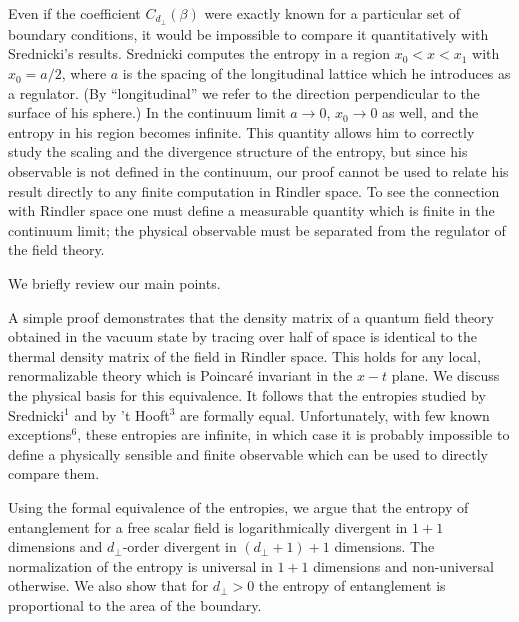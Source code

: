 Even if the coefficient $C_{d_\perp}(\beta)$ were exactly known
for a particular set of boundary conditions, it would be impossible
to compare it quantitatively with Srednicki's results.
Srednicki computes the entropy
in a region $x_0<x<x_1$ with $x_0=a/2$,
where $a$ is the spacing of the longitudinal lattice which he introduces as
a regulator.  (By ``longitudinal'' we refer to the direction perpendicular
to the surface of his sphere.)  In the continuum limit
$a\rightarrow 0$, $x_0\rightarrow 0$ as well,
and the entropy in his region
becomes infinite.  This quantity allows him to correctly study the scaling
 and the divergence
structure of the entropy, but since his observable is not defined in the
continuum, our proof cannot be used to
relate his result directly to any finite computation
in Rindler space.  To see the connection with Rindler space one must define
a measurable quantity which is finite in the continuum limit;
the physical observable must be
separated from the regulator of the field theory.



\bigskip
\goodbreak
{}
\nobreak
\medskip
\nobreak
We briefly review our main points.

A simple proof demonstrates that the density matrix
of a quantum field theory obtained in the vacuum state
by tracing over half of space is
identical to the thermal density matrix of the field in Rindler space.
This holds for any local, renormalizable theory which is Poincar\'e
invariant in the $x-t$ plane.
We discuss the physical basis for this
equivalence.  It follows that the entropies studied by Srednicki$^1$ and
by 't Hooft$^3$ are formally equal.
Unfortunately, with few known exceptions$^6$,
these entropies are infinite, in which case it is probably impossible to
define a physically sensible and finite
observable which can be used to directly compare them.

Using the formal equivalence of the entropies, we argue that the
entropy of entanglement for a free scalar field
is logarithmically divergent in $1+1$ dimensions and
$d_\perp$-order divergent in $(d_\perp+1)+1$ dimensions.  The normalization
of the entropy is universal in $1+1$ dimensions and non-universal
otherwise.  We also show that for $d_\perp>0$ the entropy of entanglement
is proportional to the area of the boundary.

